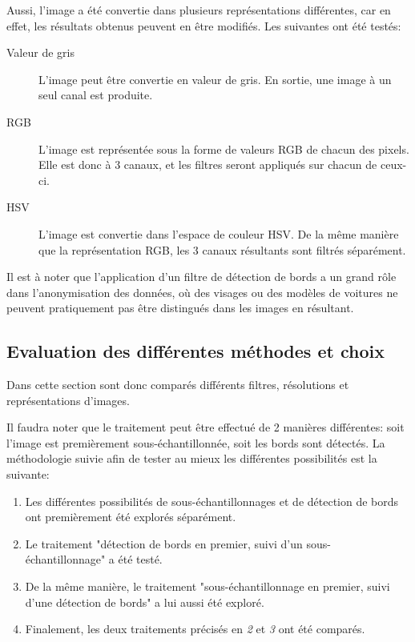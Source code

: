 Aussi, l'image a été convertie dans plusieurs représentations différentes, car en effet, les résultats obtenus peuvent en être modifiés. Les suivantes ont été testés:
\begin{description}
    \item[Valeur de gris] L'image peut être convertie en valeur de gris. En sortie, une image à un seul canal est produite.
    \item[RGB] L'image est représentée sous la forme de valeurs RGB de chacun des pixels. Elle est donc à 3 canaux, et les filtres seront appliqués sur chacun de ceux-ci.
    \item[HSV] L'image est convertie dans l'espace de couleur HSV. De la même manière que la représentation RGB, les 3 canaux résultants sont filtrés séparément.
\end{description}

Il est à noter que l'application d'un filtre de détection de bords a un grand rôle dans l'anonymisation des données, où des visages ou des modèles de voitures ne peuvent pratiquement pas être distingués dans les images en résultant.

\subsection{Evaluation des différentes méthodes et choix}
Dans cette section sont donc comparés différents filtres, résolutions et représentations d'images. 

Il faudra noter que le traitement peut être effectué de 2 manières différentes: soit l'image est premièrement sous-échantillonnée, soit les bords sont détectés. La méthodologie suivie afin de tester au mieux les différentes possibilités est la suivante:
\begin{enumerate}
    \item Les différentes possibilités de sous-échantillonnages et de détection de bords ont premièrement été explorés séparément.
    \item Le traitement "détection de bords en premier, suivi d'un sous-échantillonnage" a été testé.
    \item De la même manière, le traitement "sous-échantillonnage en premier, suivi d'une détection de bords" a lui aussi été exploré.
    \item Finalement, les deux traitements précisés en \textit{2} et \textit{3} ont été comparés.
\end{enumerate}

